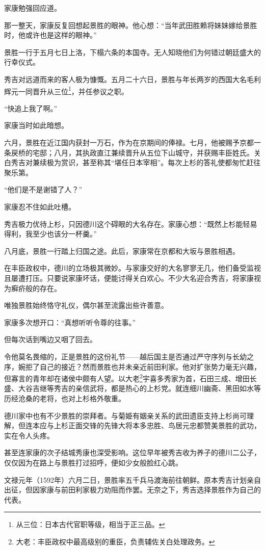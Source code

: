 \documentclass[
]{book}
\begin{document}
家康勉强回应道。

那一整天，家康反复回想起景胜的眼神。他心想：``当年武田胜赖将妹妹嫁给景胜时，他或许也是这样的眼神。''

景胜一行于五月七日上洛，下榻六条的本国寺。无人知晓他们为何错过朝廷盛大的行幸仪式。

秀吉对远道而来的客人极为慷慨。五月二十六日，景胜与年长两岁的西国大名毛利辉元一同晋升从三位\footnote{从三位：日本古代官职等级，相当于正三品。}，并任参议之职。

``快追上我了啊。''

家康当时如此暗想。

六月，景胜在近江国内获封一万石，作为在京期间的俸禄。七月，他被赐予京都一条戻桥的宅邸；八月，其执政直江兼续晋升从五位下山城守，并获赐丰臣姓氏。关白秀吉对兼续极为赏识，甚至称其``堪任日本宰相''。每次上杉的答礼使都匆忙赶往聚乐第。

``他们是不是谢错了人？''

家康忍不住如此吐槽。

秀吉极力优待上杉，只因德川这个碍眼的大名存在。家康心想：``既然上杉能轻易得利，我至少也该分一杯羹。''

八月底，景胜一行踏上归国之途。此后，家康常在京都和大坂与景胜相遇。

在丰臣政权中，德川的立场极其微妙。与家康交好的大名寥寥无几，他们备受监视且屡遭打压。只要说家康坏话，便能讨得关白欢心。不少大名迎合秀吉，将家康视为癣疥般的存在。

唯独景胜始终恪守礼仪，偶尔甚至流露出些许善意。

家康多次想开口：``真想听听令尊的往事。''

但每次话到嘴边又咽了回去。

令他莫名畏缩的，正是景胜的这份礼节------越后国主是否通过严守序列与长幼之序，婉拒了自己的接近？然而景胜也并未亲近前田利家。他对扩张势力毫无兴趣，但寡言的青年却在诸侯中颇有人望。以大老\footnote{大老：丰臣政权中最高级别的重臣，负责辅佐关白处理政务。}宇喜多秀家为首，石田三成、增田长盛、大谷吉继等秀吉的亲信武将，都是热心的上杉党。就连细川幽斋、黑田如水等历经沧桑的老将，也对上杉格外敬重。

德川家中也有不少景胜的崇拜者。与菊姫有姻亲关系的武田遗臣支持上杉尚可理解，但连本应与上杉正面交锋的先锋大将本多忠胜、鸟居元忠都赞美景胜的武功，实在令人头疼。

甚至连家康的次子结城秀康也深受影响。这位早年被秀吉收为养子的德川二公子，仅仅因为在路上与景胜打过招呼，便如少女般脸红心跳。

文禄元年（1592年）六月二日，景胜率五千兵马渡海前往朝鲜。原本秀吉计划亲自出征，但因家康与前田利家极力劝阻而作罢。无奈之下，秀吉选择景胜作为自己的代表。
\end{document}
